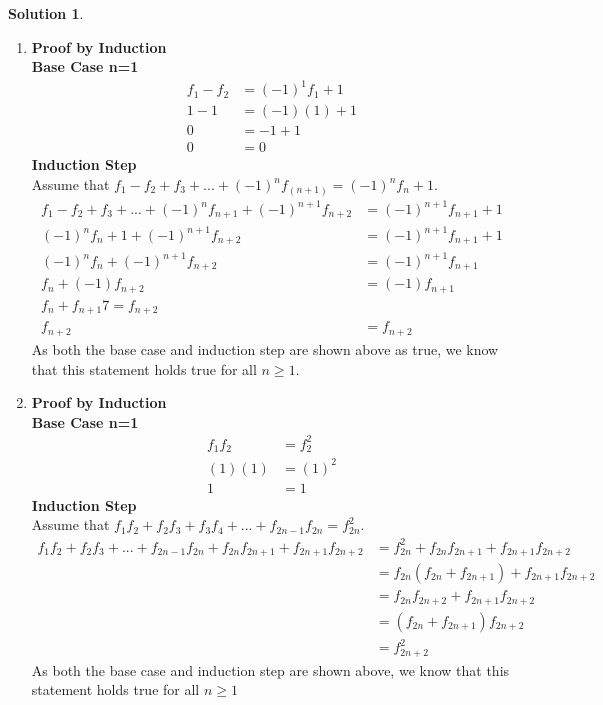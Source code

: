 \documentclass{article}
\theoremstyle{definition}
\newtheorem*{solution}{Solution}
\begin{document}
\begin{solution}\text{ \\}
\begin{enumerate}[label = \alph*)]
    \item
    \textbf{Proof by Induction}\\
    \textbf{Base Case n=1}
    \begin{align*}
        f_1-f_2&=(-1)^1f_1+1\\
        1-1&=(-1)(1)+1\\
        0&=-1+1\\
        0&=0
    \end{align*}
    \textbf{Induction Step}\\
    Assume that $f_1 - f_2 + f_3 + ... + (-1)^n f_(n+1) = (-1)^n f_n +1$. \\
    \begin{align*}
        f_1-f_2+f_3+...+(-1)^nf_{n+1}+(-1)^{n+1}f_{n+2}&=(-1)^{n+1}f_{n+1}+1\\
        (-1)^nf_n+1+(-1)^{n+1}f_{n+2}&=(-1)^{n+1}f_{n+1}+1\\
        (-1)^nf_n+(-1)^{n+1}f_{n+2}&=(-1)^{n+1}f_{n+1}\\
        f_n+(-1)f_{n+2}&=(-1)f_{n+1}\\
        f_n+f_{n+1}7=f_{n+2}\\
        f_{n+2}&=f_{n+2}
    \end{align*}
    As both the base case and induction step are shown above as true, we know that this statement holds true for all $n\ge 1$.
    
    \item 
    \textbf{Proof by Induction}\\
    \textbf{Base Case n=1}
    \begin{align*}
        f_1f_2&=f_2^2\\
        (1)(1)&=(1)^2\\
        1&=1
    \end{align*}
    \textbf{Induction Step}\\
    Assume that $f_1f_2 + f_2f_3 + f_3f_4 + ... + f_{2n-1}f_{2n} = f_{2n}^2$.
    \begin{align*}
        f_1f_2+f_2f_3+...+f_{2n-1}f_{2n}+f_{2n}f_{2n+1}+f_{2n+1}f_{2n+2}&=f_{2n}^2+f_{2n}f_{2n+1}+f_{2n+1}f_{2n+2}\\
        &=f_{2n}(f_{2n}+f_{2n+1})+f_{2n+1}f_{2n+2}\\
        &=f_{2n}f_{2n+2}+f_{2n+1}f_{2n+2}\\
        &=(f_{2n}+f_{2n+1})f_{2n+2}\\
        &=f_{2n+2}^2
    \end{align*}
    As both the base case and induction step are shown above, we know that this statement holds true for all $n\ge 1$
\end{enumerate}
\end{solution}
\end{document}
